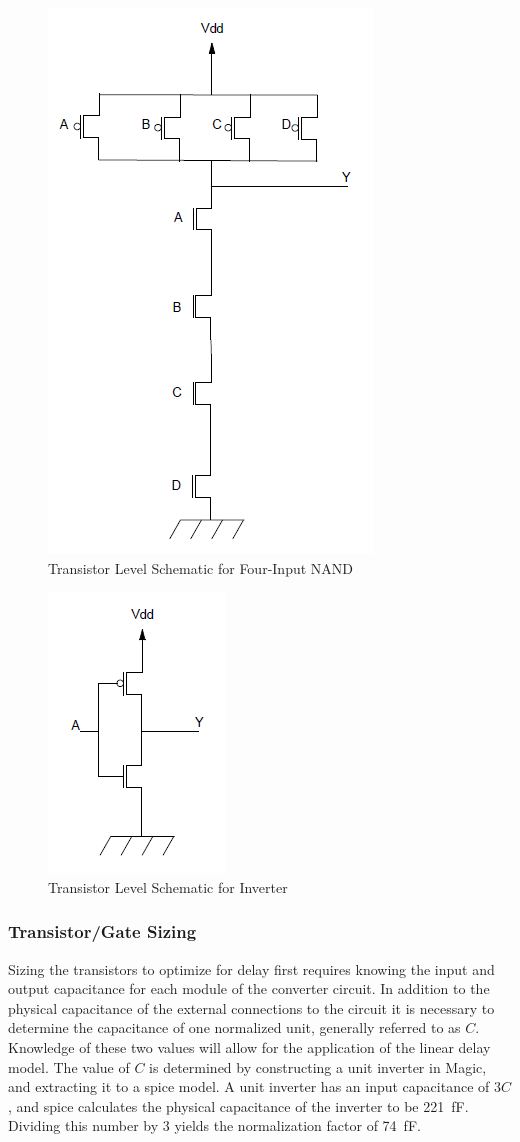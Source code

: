 \documentclass[12pt]{article}
\begin{document}
\begin{figure}[H]
	\centering
	\includegraphics[width=0.3\linewidth, keepaspectratio]{NAND_4_Trans.png}
	\caption{Transistor Level Schematic for Four-Input NAND}
	\label{fig:4nandTran}
\end{figure}

\begin{figure}[H]
	\centering
	\includegraphics[width=0.3\linewidth, keepaspectratio]{NOT_Trans.png}
	\caption{Transistor Level Schematic for Inverter}
	\label{fig:notTran}
\end{figure}

\subsubsection{Transistor/Gate Sizing}
Sizing the transistors to optimize for delay first requires knowing the input and output capacitance for each module of the converter circuit. 
In addition to the physical capacitance of the external connections to the circuit it is necessary to determine the capacitance of one normalized unit, generally referred to as \(C\).
Knowledge of these two values will allow for the application of the linear delay model.
The value of \(C\) is determined by constructing a unit inverter in Magic, and extracting it to a spice model.
A unit inverter has an input capacitance of \(3C\), and spice calculates the physical capacitance of the inverter to be \SI{221}{\femto\farad}.
Dividing this number by 3 yields the normalization factor of \SI{74}{\femto\farad}.
\end{document}
